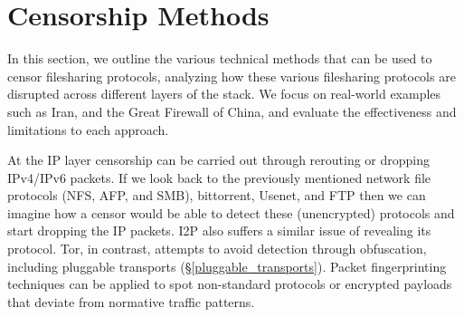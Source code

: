 




\section{Censorship Methods}\label{censorship}

In this section, we outline the various technical methods that can be used to
censor filesharing protocols, analyzing how these various filesharing protocols
are disrupted across different layers of the stack. We focus on real-world
examples such as Iran, and the Great Firewall of China, and evaluate the
effectiveness and limitations to each approach.

At the IP layer censorship can be carried out through rerouting or dropping IPv4/IPv6 packets.
\cite{wendzelSurveyInternetCensorship2025} If we look back to the previously
mentioned network file protocols (NFS, AFP, and SMB), bittorrent, Usenet, and
FTP then we can imagine how a censor would be able to detect these (unencrypted)
protocols and start dropping the IP packets. I2P also suffers a similar issue of
revealing its protocol.  Tor, in contrast, attempts to avoid detection through obfuscation, 
including pluggable transports (\S \ref{pluggable_transports}). Packet fingerprinting techniques 
can be applied to spot non-standard protocols or encrypted payloads that deviate from normative 
traffic patterns.


